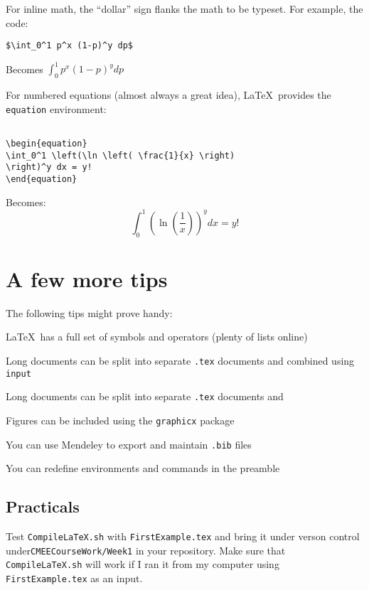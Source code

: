 For inline math, the ``dollar'' sign flanks the math to be typeset. For 
example, the code:
\begin{lstlisting}
$\int_0^1 p^x (1-p)^y dp$
\end{lstlisting}

Becomes $\int_0^1 p^x (1-p)^y dp$

For numbered equations (almost always a great idea), \LaTeX~provides 
the {\tt equation} environment:

\begin{lstlisting}

\begin{equation}
\int_0^1 \left(\ln \left( \frac{1}{x} \right) 
\right)^y dx = y!
\end{equation}

\end{lstlisting}

Becomes:
\begin{equation}
\int_0^1 \left(\ln \left( \frac{1}{x} \right) \right)^y dx = y!
\end{equation}

\section{A few more tips}

The following tips might prove handy:

\begin{compactitem}
\item \LaTeX~has a full set of symbols and operators (plenty of lists online)
\item Long documents can be split into separate {\tt.tex} documents and
combined using {\tt input}
\item Long documents can be split into separate {\tt.tex} documents and
\item Figures can be included using the {\tt graphicx} package
\item You can use Mendeley to export and maintain {\tt .bib} files
\item You can redefine environments and commands in the preamble 
\end{compactitem}

\subsection[Practical]{Practicals}
  
	Test {\tt CompileLaTeX.sh} with {\tt FirstExample.tex} and 
	bring it under verson control under{\tt CMEECourseWork/Week1} in 
	your repository. Make sure that {\tt CompileLaTeX.sh} will work if 
	I ran it from my computer using {\tt FirstExample.tex} as an input.

